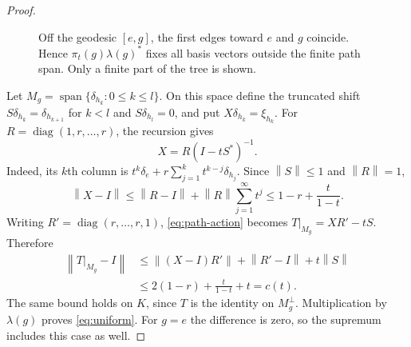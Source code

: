 \documentclass[11pt]{article}
\theoremstyle{definition}
\theoremstyle{remark}
\newcommand{\id}{I}
\newcommand{\norm}[1]{\left\|#1\right\|}
\DeclareMathOperator{\spanop}{span}
\begin{document}
\begin{proof}
\begin{figure}[tb]
\centering
{}
\caption{Off the geodesic $[e,g]$, the first edges toward $e$ and $g$
coincide. Hence $\pi_t(g)\lambda(g)^*$ fixes all basis vectors outside
the finite path span. Only a finite part of the tree is shown.}
\label{fig:tree}
\end{figure}

Let $M_g=\spanop\{\delta_{h_k}:0\le k\le l\}$. On this space define the
truncated shift $S\delta_{h_k}=\delta_{h_{k+1}}$ for $k<l$ and
$S\delta_{h_l}=0$, and put $X\delta_{h_k}=\xi_{h_k}$.
For $R=\operatorname{diag}(1,r,\ldots,r)$, the recursion gives
\begin{equation}\label{eq:X}
X=R(\id-tS^*)^{-1}.
\end{equation}
Indeed, its $k$th column is
$t^k\delta_e+r\sum_{j=1}^k t^{k-j}\delta_{h_j}$.
Since $\norm{S}\le1$ and $\norm{R}=1$,
\begin{equation}\label{eq:Xbound}
\norm{X-\id}\le\norm{R-\id}
+\norm{R}\sum_{j=1}^{\infty}t^j
\le1-r+\frac{t}{1-t}.
\end{equation}
Writing $R'=\operatorname{diag}(r,\ldots,r,1)$,
\eqref{eq:path-action} becomes $T|_{M_g}=XR'-tS$. Therefore
\begin{align*}
\norm{T|_{M_g}-\id}
&\le\norm{(X-\id)R'}+\norm{R'-\id}+t\norm{S}\\
&\le2(1-r)+\frac{t}{1-t}+t=c(t).
\end{align*}
The same bound holds on $K$, since $T$ is the identity on $M_g^\perp$.
Multiplication by $\lambda(g)$ proves \eqref{eq:uniform}. For $g=e$ the
difference is zero, so the supremum includes this case as well.
\end{proof}
\end{document}
